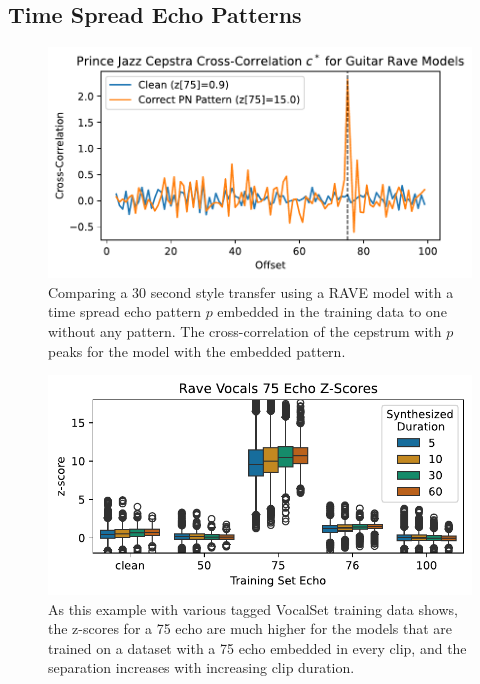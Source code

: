 \documentclass[letterpaper]{article} %
\begin{document}
\subsection{Time Spread Echo Patterns}

\begin{figure}
    \centering
    \includegraphics[width=\columnwidth]{figs/RavePNCepstra.pdf}
    \caption{Comparing a 30 second style transfer using a RAVE model with a time spread echo pattern $p$ embedded in the training data to one without any pattern.  The cross-correlation of the cepstrum with $p$ peaks for the model with the embedded pattern. }
    \label{fig:ravepncepstra}
\end{figure}

\begin{figure}
    \centering
    \includegraphics[width=\columnwidth]{figs/RaveZScoreExamples.pdf}
    \caption{As this example with various tagged VocalSet training data shows, the z-scores for a 75 echo are much higher for the models that are trained on a dataset with a 75 echo embedded in every clip, and the separation increases with increasing clip duration.}
    \label{fig:ravezscoreexamples}
\end{figure}
\end{document}
